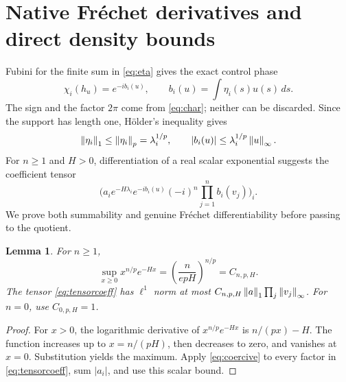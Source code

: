 \documentclass[11pt]{article}
\newtheorem{lemma}[theorem]{Lemma}
\theoremstyle{remark}\newtheorem{remark}[theorem]{Remark}
\begin{document}
\section{Native Fr\'echet derivatives and direct density bounds}\label{sec:derivatives}
Fubini for the finite sum in \eqref{eq:eta} gives the exact control phase
\begin{equation}\label{eq:phase}
 \chi_i(h_u)=e^{-i b_i(u)},\qquad
 b_i(u)=\int\eta_i(s)u(s)\,ds.
\end{equation}
The sign and the factor $2\pi$ come from \eqref{eq:char}; neither can be discarded. Since the support has length one, H\"older's inequality gives
\begin{equation}\label{eq:coercive}
 \left\lVert\eta_i\right\rVert_1\le\left\lVert\eta_i\right\rVert_p=\lambda_i^{1/p},\qquad
 |b_i(u)|\le\lambda_i^{1/p}\left\lVert u\right\rVert_\infty.
\end{equation}
For $n\ge1$ and $H>0$, differentiation of a real scalar exponential suggests the coefficient tensor
\begin{equation}\label{eq:tensorcoeff}
 \Big(a_i e^{-H\lambda_i}e^{-i b_i(u)}
       (-i)^n\prod_{j=1}^n b_i(v_j)\Big)_i.
\end{equation}
We prove both summability and genuine Fr\'echet differentiability before passing to the quotient.

\begin{lemma}\label{lem:multiplier}
For $n\ge1$,
\[
 \sup_{x\ge0}x^{n/p}e^{-Hx}
 =\left(\frac{n}{epH}\right)^{n/p}=C_{n,p,H}.
\]
The tensor \eqref{eq:tensorcoeff} has $\ell^1$ norm at most $C_{n,p,H}\left\lVert a\right\rVert_1\prod_j\left\lVert v_j\right\rVert_\infty$. For $n=0$, use $C_{0,p,H}=1$.
\end{lemma}
\begin{proof}
For $x>0$, the logarithmic derivative of $x^{n/p}e^{-Hx}$ is $n/(px)-H$. The function increases up to $x=n/(pH)$, then decreases to zero, and vanishes at $x=0$. Substitution yields the maximum. Apply \eqref{eq:coercive} to every factor in \eqref{eq:tensorcoeff}, sum $|a_i|$, and use this scalar bound.
\end{proof}
\end{document}
